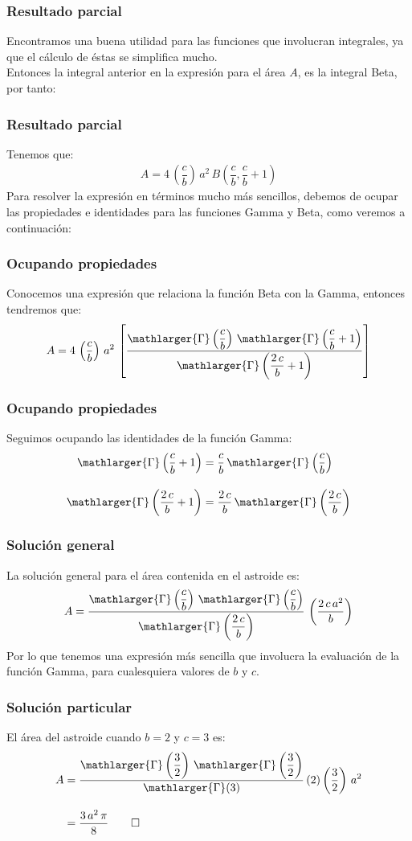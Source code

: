 \begin{frame}
\frametitle{Resultado parcial}
Encontramos una buena utilidad para las funciones que involucran integrales, ya que el cálculo de éstas se simplifica mucho.
\\
\bigskip
\pause
Entonces la integral anterior en la expresión para el área $A$, es la integral Beta, por tanto:
\end{frame}
\begin{frame}
\frametitle{Resultado parcial}
Tenemos que:
\begin{align*}
A = 4 \, \left( \dfrac{c}{b} \right) \, a^{2} \, B \left( \dfrac{c}{b}, \dfrac{c}{b} + 1 \right)
\end{align*}
\pause
Para resolver la expresión en términos mucho más sencillos, debemos de ocupar las propiedades e identidades para las funciones Gamma y Beta, como veremos a continuación:
\end{frame}
\begin{frame}
\frametitle{Ocupando propiedades}
Conocemos una expresión que relaciona la función Beta con la Gamma, entonces tendremos que:
\begin{align*}
A = 4 \, \left( \dfrac{c}{b} \right) \, a^{2} \, \left[ \dfrac{\mathlarger{\Gamma} \left( \dfrac{c}{b} \right) \, \mathlarger{\Gamma} \left( \dfrac{c}{b} + 1 \right)}{\mathlarger{\Gamma} \left( \dfrac{2 \, c}{b} + 1 \right)} \right]
\end{align*}
\end{frame}
\begin{frame}
\frametitle{Ocupando propiedades}
Seguimos ocupando las identidades de la función Gamma:
\begin{align*}
\mathlarger{\Gamma} \left( \dfrac{c}{b} + 1 \right) &= \dfrac{c}{b} \, \mathlarger{\Gamma} \left( \dfrac{c}{b} \right) \\[1em]
\mathlarger{\Gamma} \left( \dfrac{2 \, c}{b} + 1 \right) &= \dfrac{2 \, c}{b} \, \mathlarger{\Gamma} \left( \dfrac{2 \, c}{b} \right)
\end{align*}
\end{frame}
\begin{frame}
\frametitle{Solución general}
La solución general para el área contenida en el astroide es:
\begin{align*}
A = \dfrac{\mathlarger{\Gamma} \left( \dfrac{c}{b} \right) \, \mathlarger{\Gamma} \left( \dfrac{c}{b} \right)}{\mathlarger{\Gamma} \left( \dfrac{2 \, c}{b} \right)} \, \left( \dfrac{2 \, c \, a^{2}}{b} \right)
\end{align*}
\pause
Por lo que tenemos una expresión más sencilla que involucra la evaluación de la función Gamma, para cualesquiera valores de $b$ y $c$.
\end{frame}
\begin{frame}
\frametitle{Solución particular}
El área del astroide cuando $b = 2$ y $c = 3$ es:
\begin{align*}
A &= \dfrac{\mathlarger{\Gamma} \left( \dfrac{3}{2} \right) \, \mathlarger{\Gamma} \left( \dfrac{3}{2} \right)}{\mathlarger{\Gamma} (3)} \, (2) \left( \dfrac{3}{2} \right) \, a^{2} \\[1em]
&= \dfrac{3 \, a^{2} \, \pi}{8} \qed
\end{align*}
\end{frame}
